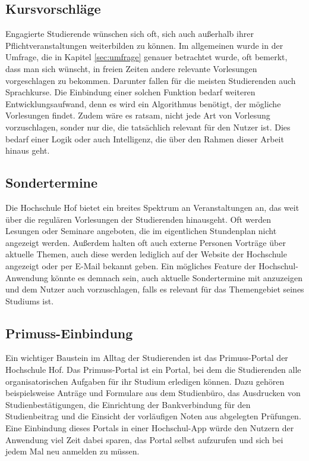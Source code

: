 \subsection*{Kursvorschläge}

Engagierte Studierende wünschen sich oft, sich auch außerhalb ihrer Pflichtveranstaltungen weiterbilden zu können. Im allgemeinen wurde in der Umfrage, die in Kapitel \ref{sec:umfrage} genauer betrachtet wurde, oft bemerkt, dass man sich wünscht, in freien Zeiten andere relevante Vorlesungen vorgeschlagen zu bekommen. Darunter fallen für die meisten Studierenden auch Sprachkurse. Die Einbindung einer solchen Funktion bedarf weiteren Entwicklungsaufwand, denn es wird ein Algorithmus benötigt, der mögliche Vorlesungen findet. Zudem wäre es ratsam, nicht jede Art von Vorlesung vorzuschlagen, sonder nur die, die tatsächlich relevant für den Nutzer ist. Dies bedarf einer Logik oder auch Intelligenz, die über den Rahmen dieser Arbeit hinaus geht.

\subsection*{Sondertermine}

Die Hochschule Hof bietet ein breites Spektrum an Veranstaltungen an, das weit über die regulären Vorlesungen der Studierenden hinausgeht. Oft werden Lesungen oder Seminare angeboten, die im eigentlichen Stundenplan nicht angezeigt werden. Außerdem halten oft auch externe Personen Vorträge über aktuelle Themen, auch diese werden lediglich auf der Website der Hochschule angezeigt oder per E-Mail bekannt geben. Ein mögliches Feature der Hochschul-Anwendung könnte es demnach sein, auch aktuelle Sondertermine mit anzuzeigen und dem Nutzer auch vorzuschlagen, falls es relevant für das Themengebiet seines Studiums ist.

\subsection*{Primuss-Einbindung}

Ein wichtiger Baustein im Alltag der Studierenden ist das Primuss-Portal der Hochschule Hof. Das Primuss-Portal ist ein Portal, bei dem die Studierenden alle organisatorischen Aufgaben für ihr Studium erledigen können. Dazu gehören beispielsweise Anträge und Formulare aus dem Studienbüro, das Ausdrucken von Studienbestätigungen, die Einrichtung der Bankverbindung für den Studienbeitrag und die Einsicht der vorläufigen Noten aus abgelegten Prüfungen. Eine Einbindung dieses Portals in einer Hochschul-\ac{App} würde den Nutzern der Anwendung viel Zeit dabei sparen, das Portal selbst aufzurufen und sich bei jedem Mal neu anmelden zu müssen. 

